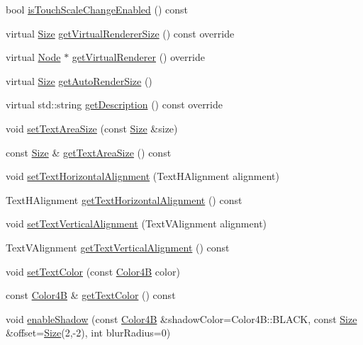 \begin{DoxyCompactItemize}
bool \hyperlink{classui_1_1Text_a182273c96f2c8a6006165cdff11f99da}{is\+Touch\+Scale\+Change\+Enabled} () const
\item 
virtual \hyperlink{classSize}{Size} \hyperlink{classui_1_1Text_aabb0e1e54bad95f923c6b8206bf18b5a}{get\+Virtual\+Renderer\+Size} () const override
\item 
virtual \hyperlink{classNode}{Node} $\ast$ \hyperlink{classui_1_1Text_a4a1e00d5f586e01d94c8dec146741dce}{get\+Virtual\+Renderer} () override
\item 
virtual \hyperlink{classSize}{Size} \hyperlink{classui_1_1Text_afb99024edec8757656da4c077e140b7f}{get\+Auto\+Render\+Size} ()
\item 
virtual std\+::string \hyperlink{classui_1_1Text_a0e8df6544b351130890d9af3e7433582}{get\+Description} () const override
\item 
void \hyperlink{classui_1_1Text_a501a7ded90590c52c4a395d2b721abf3}{set\+Text\+Area\+Size} (const \hyperlink{classSize}{Size} \&size)
\item 
const \hyperlink{classSize}{Size} \& \hyperlink{classui_1_1Text_ab2932885885b8e3b56e9eac14ea7c8cf}{get\+Text\+Area\+Size} () const
\item 
void \hyperlink{classui_1_1Text_ae76ef053948ec415d03827db39e6c483}{set\+Text\+Horizontal\+Alignment} (Text\+H\+Alignment alignment)
\item 
Text\+H\+Alignment \hyperlink{classui_1_1Text_abf22329df9a691ea67653c2d0b04005c}{get\+Text\+Horizontal\+Alignment} () const
\item 
void \hyperlink{classui_1_1Text_ab38e94ca471d5d21dfd9fc66311efcd5}{set\+Text\+Vertical\+Alignment} (Text\+V\+Alignment alignment)
\item 
Text\+V\+Alignment \hyperlink{classui_1_1Text_a06e980f114651a661c60ea2de3ec365d}{get\+Text\+Vertical\+Alignment} () const
\item 
void \hyperlink{classui_1_1Text_aa81c41969f7e1b473c6a8dfc4dc22e55}{set\+Text\+Color} (const \hyperlink{structColor4B}{Color4B} color)
\item 
const \hyperlink{structColor4B}{Color4B} \& \hyperlink{classui_1_1Text_aaa188060aad37b5f6df4665a2b7d0f16}{get\+Text\+Color} () const
\item 
void \hyperlink{classui_1_1Text_a88d16f381c90e53c2346763e4fc810c8}{enable\+Shadow} (const \hyperlink{structColor4B}{Color4B} \&shadow\+Color=Color4\+B\+::\+B\+L\+A\+CK, const \hyperlink{classSize}{Size} \&offset=\hyperlink{classSize}{Size}(2,-\/2), int blur\+Radius=0)
\item 

\end{DoxyCompactItemize}

